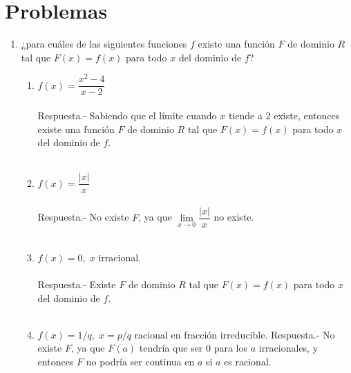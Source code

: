 \section{Problemas}
\begin{enumerate}[\bfseries 1.]

\item ¿para cuáles de las siguientes funciones $f$ existe una función $F$ de dominio $R$ tal que $F(x)=f(x)$ para todo $x$ del dominio de $f$?

    \begin{enumerate}[\bfseries (i)]

	\item $f(x) = \dfrac{x^2 - 4}{x - 2}$\\\\
	    Respuesta.-\; Sabiendo que el límite cuando $x$ tiende a $2$ existe, entonces existe una función $F$ de dominio $R$ tal que $F(x)=f(x)$ para todo $x$ del dominio de $f$.\\\\

	\item $f(x) = \dfrac{|x|}{x}$\\\\
	    Respuesta.-\; No existe $F$, ya que $\lim\limits_{x\to 0} \dfrac{|x|}{x}$ no existe.\\\\

	\item $f(x) = 0,\; x$ irracional.\\\\
	    Respuesta.-\; Existe $F$ de dominio $R$ tal que $F(x)=f(x)$ para todo $x$ del dominio de $f$.\\\\

	\item $f(x) = 1/q, \; x = p/q$ racional en fracción irreducible.
	    Respuesta.-\; No existe $F$, ya que $F(a)$ tendría que ser $0$ para los $a$ irracionales, y entonces $F$ no podría ser continua en $a$ si $a$ es racional.\\\\

    \end{enumerate}


\end{enumerate}

